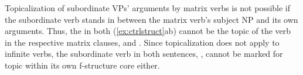 Topicalization of subordinate VPs' arguments
by matrix verbs is not possible if the subordinate verb stands in
between the matrix verb's subject NP and its own arguments.
Thus, the  in both (\ref{ex:ctrlstruct}ab) cannot
be the topic of the verb in the respective
matrix clauses,  and . Since topicalization does not apply to
infinite verbs, the subordinate verb in both sentences,
, cannot be marked for
topic within its own f-structure core either.




